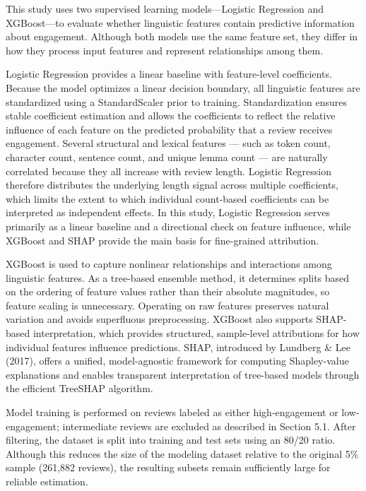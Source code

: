 \documentclass[12pt]{article}
\begin{document}
This study uses two supervised learning models—Logistic Regression and XGBoost—to evaluate whether linguistic features contain predictive information about engagement. Although both models use the same feature set, they differ in how they process input features and represent relationships among them.

Logistic Regression provides a linear baseline with feature-level coefficients. Because the model optimizes a linear decision boundary, all linguistic features are standardized using a StandardScaler prior to training. Standardization ensures stable coefficient estimation and allows the coefficients to reflect the relative influence of each feature on the predicted probability that a review receives engagement.
Several structural and lexical features — such as token count, character count, sentence count, and unique lemma count — are naturally correlated because they all increase with review length. Logistic Regression therefore distributes the underlying length signal across multiple coefficients, which limits the extent to which individual count-based coefficients can be interpreted as independent effects. In this study, Logistic Regression serves primarily as a linear baseline and a directional check on feature influence, while XGBoost and SHAP provide the main basis for fine-grained attribution.

XGBoost is used to capture nonlinear relationships and interactions among linguistic features. As a tree-based ensemble method, it determines splits based on the ordering of feature values rather than their absolute magnitudes, so feature scaling is unnecessary. Operating on raw features preserves natural variation and avoids superfluous preprocessing. XGBoost also supports SHAP-based interpretation, which provides structured, sample-level attributions for how individual features influence predictions. SHAP, introduced by Lundberg \& Lee (2017), offers a unified, model-agnostic framework for computing Shapley-value explanations and enables transparent interpretation of tree-based models through the efficient TreeSHAP algorithm.

Model training is performed on reviews labeled as either high-engagement or low-engagement; intermediate reviews are excluded as described in Section 5.1. After filtering, the dataset is split into training and test sets using an 80/20 ratio. Although this reduces the size of the modeling dataset relative to the original 5\% sample (261,882 reviews), the resulting subsets remain sufficiently large for reliable estimation.
\end{document}
